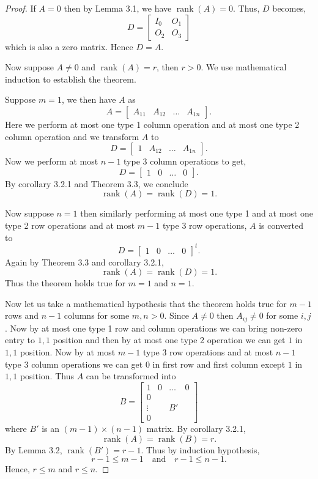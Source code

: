 \documentclass[12pt, a4paper]{article}
\theoremstyle{definition}
\theoremstyle{remark}
\DeclareMathOperator{\rank}{rank}
\begin{document}
\begin{proof}
If $A = 0$ then by Lemma 3.1, we have $\rank(A) = 0$. Thus, $D$ becomes,
\[
D = \begin{bmatrix} I_0 & O_1 \\ O_2 & O_3 \end{bmatrix}
\]
which is also a zero matrix. Hence $D = A$.

Now suppose $A \ne 0$ and $\rank(A) = r$, then $r > 0$. We use mathematical induction to establish the theorem.

Suppose $m = 1$, we then have $A$ as
\[
A = \begin{bmatrix} A_{11} & A_{12} & \dots & A_{1n} \end{bmatrix}.
\]
Here we perform at most one type 1 column operation and at most one type 2 column operation and we transform $A$ to
\[
D = \begin{bmatrix} 1 & A_{12} & \dots & A_{1n} \end{bmatrix}.
\]
Now we perform at most $n-1$ type 3 column operations to get,
\[
D = \begin{bmatrix} 1 & 0 & \dots & 0 \end{bmatrix}.
\]
By corollary 3.2.1 and Theorem 3.3, we conclude
\[
\rank(A) = \rank(D) = 1.
\]

Now suppose $n = 1$ then similarly performing at most one type 1 and at most one type 2 row operations and at most $m-1$ type 3 row operations, $A$ is converted to
\[
D = \begin{bmatrix} 1 & 0 & \dots & 0 \end{bmatrix}^t.
\]
Again by Theorem 3.3 and corollary 3.2.1,
\[
\rank(A) = \rank(D) = 1.
\]
Thus the theorem holds true for $m = 1$ and $n = 1$.

Now let us take a mathematical hypothesis that the theorem holds true for $m-1$ rows and $n-1$ columns for some $m, n > 0$. Since $A \ne 0$ then $A_{ij} \ne 0$ for some $i, j$. Now by at most one type 1 row and column operations we can bring non-zero entry to $1,1$ position and then by at most one type 2 operation we can get $1$ in $1,1$ position. Now by at most $m-1$ type 3 row operations and at most $n-1$ type 3 column operations we can get $0$ in first row and first column except $1$ in $1,1$ position. Thus $A$ can be transformed into
\[
B = \left[
\begin{array}{c|ccc}
1 & 0 & \dots & 0 \\ \hline
0 &   &       &   \\
\vdots & & B'    &   \\
0 &   &       &   
\end{array}
\right]
\]
where $B'$ is an $(m-1) \times (n-1)$ matrix. By corollary 3.2.1,
\[
\rank(A) = \rank(B) = r.
\]
By Lemma 3.2, $\rank(B') = r - 1$. Thus by induction hypothesis,
\[
r - 1 \le m - 1 \quad \text{and} \quad r - 1 \le n - 1.
\]
Hence, $r \le m$ and $r \le n$.


\end{proof}
\end{document}

